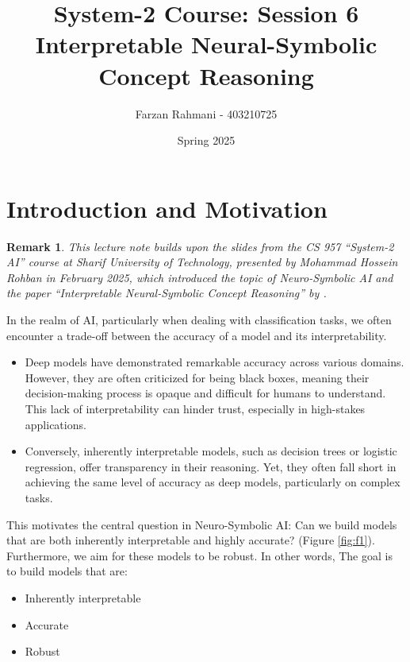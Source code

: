 \documentclass[10pt, oneside]{article}
\title{System-2 Course: Session 6 
\\ Interpretable Neural-Symbolic Concept Reasoning}
\author{Farzan Rahmani - 403210725}
\date{Spring 2025}
\newtheorem{rem}{Remark}
\begin{document}
\maketitle

\tableofcontents

\pagebreak

\section{Introduction and Motivation}
\begin{rem}
   This lecture note builds upon the slides from the CS 957 ``System-2 AI'' course at Sharif University of Technology, presented by Mohammad Hossein Rohban in February 2025, which introduced the topic of Neuro-Symbolic AI and the paper ``Interpretable Neural-Symbolic Concept Reasoning'' by \citet{dcr}.
\end{rem}

In the realm of AI, particularly when dealing with classification tasks, we often encounter a trade-off between the accuracy of a model and its interpretability.

\begin{itemize}
   \item Deep models have demonstrated remarkable accuracy across various domains. However, they are often criticized for being black boxes, meaning their decision-making process is opaque and difficult for humans to understand. This lack of interpretability can hinder trust, especially in high-stakes applications.
   \item Conversely, inherently interpretable models, such as decision trees or logistic regression, offer transparency in their reasoning. Yet, they often fall short in achieving the same level of accuracy as deep models, particularly on complex tasks.
\end{itemize}

This motivates the central question in Neuro-Symbolic AI: Can we build models that are both inherently interpretable and highly accurate? (Figure \ref{fig:f1}). Furthermore, we aim for these models to be robust. In other words, The goal is to build models that are:
\begin{itemize}
   \item Inherently interpretable
   \item Accurate
   \item Robust
\end{itemize}
\end{document}
